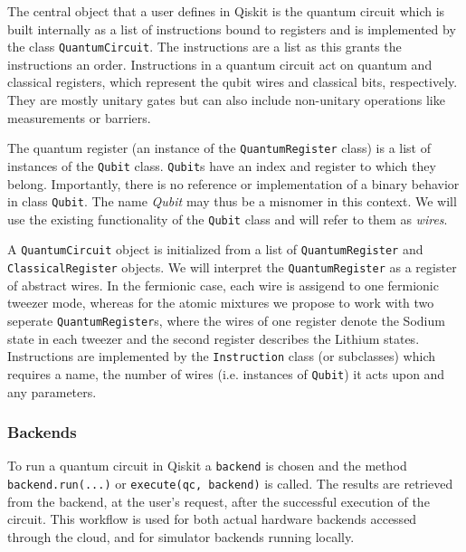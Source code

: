 \documentclass[a4paper, 10pt]{article}
\begin{document}
    The central object that a user defines in Qiskit is the quantum circuit which is built internally as a list of instructions bound to registers and is implemented by the class \texttt{QuantumCircuit}.
    The instructions are a list as this grants the instructions an order. Instructions in a quantum circuit act on quantum and classical registers, which represent the qubit wires and classical bits, respectively. They are mostly unitary gates but can also include non-unitary operations like measurements or barriers.
    
    The quantum register (an instance of the \texttt{QuantumRegister} class) is a list of instances of the \texttt{Qubit} class.
    \texttt{Qubit}s have an index and register to which they belong.
    Importantly, there is no reference or implementation of a binary behavior in class \texttt{Qubit}.
    The name \emph{Qubit} may thus be a misnomer in this context. We will use the existing functionality of the \texttt{Qubit} class and will refer to them as \emph{wires}.
    
    A \texttt{QuantumCircuit} object is initialized from a list of \texttt{QuantumRegister} and \texttt{ClassicalRegister} objects. We will interpret the \texttt{QuantumRegister} as a register of abstract wires. In the fermionic case, each wire is assigend to one fermionic tweezer mode, whereas for the atomic mixtures we propose to work with two seperate \texttt{QuantumRegister}s, where the wires of one register denote the Sodium state in each tweezer and the second register describes the Lithium states.
    Instructions are implemented by the \texttt{Instruction} class (or subclasses) which requires a name, the number of wires (i.e. instances of \texttt{Qubit}) it acts upon and any parameters.
    
\subsubsection{Backends\label{sec:qiskit_backends}}
    
To run a quantum circuit in Qiskit a \texttt{backend} is chosen and the method \texttt{backend.run(...)} or \texttt{execute(qc, backend)} is called.
The results are retrieved from the backend, at the user's request, after the successful execution of the circuit.
This workflow is used for both actual hardware backends accessed through the cloud, and for simulator backends running locally. 
    
\end{document}
